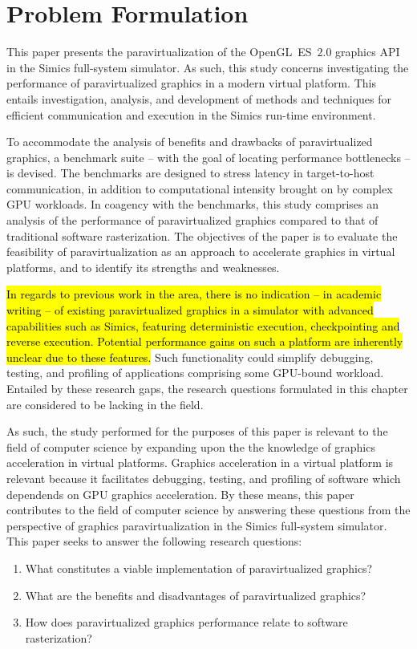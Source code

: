 
\section{Problem Formulation}
\label{sec:problemformulation}
This paper presents the paravirtualization of the OpenGL~ES~$2.0$ graphics API in the Simics full-system simulator. 
As such, this study concerns investigating the performance of paravirtualized graphics in a modern virtual platform.
This entails investigation, analysis, and development of methods and techniques for efficient communication and execution in the Simics run-time environment.

To accommodate the analysis of benefits and drawbacks of paravirtualized graphics, a benchmark suite -- with the goal of locating performance bottlenecks -- is devised.
The benchmarks are designed to stress latency in target-to-host communication, in addition to computational intensity brought on by complex GPU workloads.
In coagency with the benchmarks, this study comprises an analysis of the performance of paravirtualized graphics compared to that of traditional software rasterization.
The objectives of the paper is to evaluate the feasibility of paravirtualization as an approach to accelerate graphics in virtual platforms, and to identify its strengths and weaknesses.

\hl{In regards to previous work in the area, there is no indication -- in academic writing -- of existing paravirtualized graphics in a simulator with advanced capabilities such as Simics, featuring deterministic execution, checkpointing and reverse execution.
Potential performance gains on such a platform are inherently unclear due to these features.}
Such functionality could simplify debugging, testing, and profiling of applications comprising some GPU-bound workload.
Entailed by these research gaps, the research questions formulated in this chapter are considered to be lacking in the field.

As such, the study performed for the purposes of this paper is relevant to the field of computer science by expanding upon the the knowledge of graphics acceleration in virtual platforms. Graphics acceleration in a virtual platform is relevant because it facilitates debugging, testing, and profiling of software which dependends on GPU graphics acceleration.
By these means, this paper contributes to the field of computer science by answering these questions from the perspective of graphics paravirtualization in the Simics full-system simulator.
This paper seeks to answer the following research questions:

\begin{enumerate}
  \item What constitutes a viable implementation of paravirtualized graphics?
  \item What are the benefits and disadvantages of paravirtualized graphics?
  \item How does paravirtualized graphics performance relate to software rasterization?
\end{enumerate}
